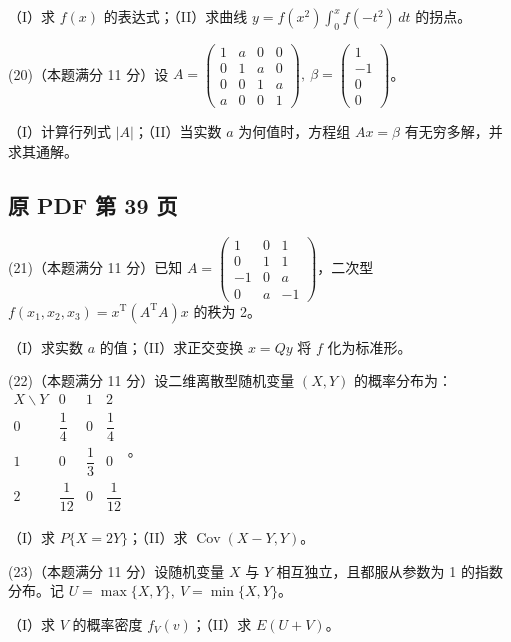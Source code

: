 \documentclass[UTF8,12pt]{ctexart}
\begin{document}
（I）求 \(\displaystyle f(x)\) 的表达式；（II）求曲线 \(\displaystyle y=f(x^2)\displaystyle \int_0^x f(-t^2)\,dt\) 的拐点。


(20)（本题满分 11 分）设 \(\displaystyle A=\begin{pmatrix}1&a&0&0\\0&1&a&0\\0&0&1&a\\a&0&0&1\end{pmatrix},\allowbreak \ \beta=\begin{pmatrix}1\\-1\\0\\0\end{pmatrix}\)。


（I）计算行列式 \(\displaystyle |A|\)；（II）当实数 \(\displaystyle a\) 为何值时，方程组 \(\displaystyle Ax=\beta\) 有无穷多解，并求其通解。


\clearpage

\subsection*{原 PDF 第 39 页}

(21)（本题满分 11 分）已知 \(\displaystyle A=\begin{pmatrix}1&0&1\\0&1&1\\-1&0&a\\0&a&-1\end{pmatrix}\)，二次型 \(\displaystyle f(x_1,\allowbreak x_2,\allowbreak x_3)=x^{\mathrm T}(A^{\mathrm T}A)x\) 的秩为 2。


（I）求实数 \(\displaystyle a\) 的值；（II）求正交变换 \(\displaystyle x=Qy\) 将 \(\displaystyle f\) 化为标准形。


(22)（本题满分 11 分）设二维离散型随机变量 \(\displaystyle (X,\allowbreak Y)\) 的概率分布为：\(\displaystyle \begin{array}{c|ccc}X\backslash Y&0&1&2\\\hline 0&\dfrac{\displaystyle 1}{\displaystyle 4}&0&\dfrac{\displaystyle 1}{\displaystyle 4}\\1&0&\dfrac{\displaystyle 1}{\displaystyle 3}&0\\2&\dfrac{\displaystyle 1}{\displaystyle 12}&0&\dfrac{\displaystyle 1}{\displaystyle 12}\end{array}\)。


（I）求 \(\displaystyle P\{X=2Y\}\)；（II）求 \(\displaystyle \operatorname{Cov}(X-Y,\allowbreak Y)\)。


(23)（本题满分 11 分）设随机变量 \(\displaystyle X\) 与 \(\displaystyle Y\) 相互独立，且都服从参数为 1 的指数分布。记 \(\displaystyle U=\displaystyle \max\{X,\allowbreak Y\},\allowbreak \ V=\displaystyle \min\{X,\allowbreak Y\}\)。


（I）求 \(\displaystyle V\) 的概率密度 \(\displaystyle f_V(v)\)；（II）求 \(\displaystyle E(U+V)\)。


\clearpage
\end{document}
